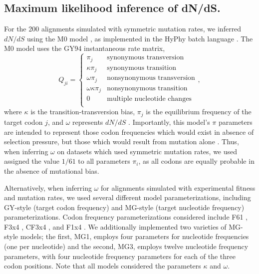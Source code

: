 \documentclass[11pt]{article}
\begin{document}
\subsection*{Maximum likelihood inference of dN/dS.}
For the 200 alignments simulated with symmetric mutation rates, we inferred $dN/dS$ using the M0 model \cite{Yangetal2000}, as implemented in the HyPhy batch language \cite{KosakovskyPondetal2005}. The M0 model uses the GY94 instantaneous rate matrix,
\begin{equation}\label{eq:GY94}
Q_{ji} = \left\{ 
	\begin{array}{rl}
	\pi_j                  &\mbox{synonymous transversion} \\
	\kappa \pi_j           &\mbox{synonymous transition} \\
 	\omega \pi_j           &\mbox{nonsynonymous transversion} \\
 	\omega \kappa \pi_j    &\mbox{nonsynonymous transition} \\
	0                      &\mbox{multiple nucleotide changes} \\             
	\end{array} \right.,
\end{equation}
where $\kappa$ is the transition-transversion bias, $\pi_j$ is the equilibrium frequency of the target codon $j$, and $\omega$ represents $dN/dS$ \cite{GoldmanYang1994,NielsenYang1998}. Importantly, this model's $\pi$ parameters are intended to represent those codon frequencies which would exist in absence of selection pressure, but those which would result from mutation alone \cite{GoldmanYang1994,MuseGaut1994,YN00,Yang2006}. Thus, when inferring $\omega$ on datasets which used symmetric mutation rates, we used assigned the value $1/61$ to all parameters $\pi_i$, as all codons are  equally probable in the absence of mutational bias.

Alternatively, when inferring $\omega$ for alignments simulated with experimental fitness and mutation rates, we used several different model parameterizations, including GY-style \cite{GoldmanYang1994} (target codon frequency) and MG-style \cite{MuseGaut1994} (target nucleotide frequency) parameterizations. Codon frequency parameterizations considered include F61 \cite{GoldmanYang1994}, F3x4 \cite{GoldmanYang1994}, CF3x4 \cite{KosakovskyPond2010}, and F1x4 \cite{MuseGaut1994}. We additionally implemented two varieties of MG-style models; the first, MG1, employs four parameters for nucleotide frequencies (one per nucleotide) and the second, MG3, employs twelve nucleotide frequency parameters, with four nucleotide frequency parameters for each of the three codon positions. Note that all models considered the parameters $\kappa$ and $\omega$. 
\end{document}

